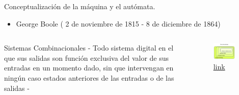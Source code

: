 \begin{frame}[fragile]{Conceptualización de la máquina y el autómata.}

	\begin{itemize}
		\item George Boole ( 2 de noviembre de 1815 - 	8 de diciembre de 1864)
	\end{itemize}
		
	\begin{columns}
		\begin{column}{0.5\textwidth}
			\vspace{10px}
			\pause
			\begin{block}{Sistemas Combinacionales }	
				\pause			
				 - Todo sistema digital en el que sus salidas son función exclusiva del valor de sus entradas en un momento dado, sin que intervengan en ningún caso estados anteriores de las entradas o de las salidas - 
					
				
			\end{block}
		\end{column}
		\begin{column}{0.5\textwidth}
			\pause
			\begin{figure}
				\centering
				
				\includegraphics[width=0.8\textwidth]{Automatas/Automatas}
				\caption{\href{https://es.wikipedia.org/wiki/Aut\%C3\%B3mata_finito}{link}}	
		\end{figure}
		\end{column}
	\end{columns}
		

\end{frame}


